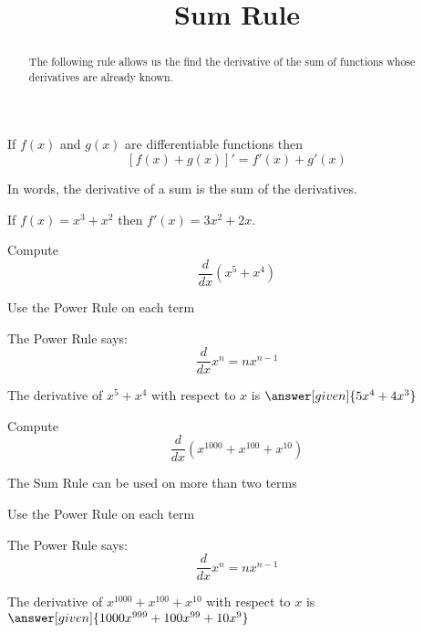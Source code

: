 \documentclass{ximera}
\title{Sum Rule}
\begin{document}
\begin{abstract}
The following rule allows us the find the derivative of the sum of functions 
whose derivatives are already known.
\end{abstract}

\maketitle

\begin{theorem} If $f(x)$ and $g(x)$ are differentiable functions then
\[[f(x) + g(x)]' =  f'(x) +  g'(x)\]
\end{theorem}

In words, the derivative of a sum is the sum of the derivatives.


\begin{example} %
If $f(x) = x^3 + x^2$ then $f'(x) = 3x^2 + 2x$.
\end{example}

\begin{problem} %
  Compute 
  \[
  \frac{d}{dx} (x^5 + x^4)
  \]
  
    \begin{hint}
      Use the Power Rule on each term
    \end{hint}
    \begin{hint}
      The Power Rule says:
      \[
      \frac{d}{dx} x^n = nx^{n-1}
      \]
    \end{hint}    
		The derivative of $x^5 + x^4$ with respect to $x$ is
		 $\answer[given]{5x^4 + 4x^3}$
	
\end{problem}

\begin{problem} %
  Compute 
  \[
  \frac{d}{dx} (x^{1000} + x^{100} + x^{10})
  \]
  
    \begin{hint}
		  The Sum Rule can be used on more than two terms
		\end{hint}
		\begin{hint}
      Use the Power Rule on each term
    \end{hint}
    \begin{hint}
      The Power Rule says:
      \[
      \frac{d}{dx} x^n = nx^{n-1}
      \]
    \end{hint}    
		The derivative of $x^{1000} + x^{100} + x^{10}$ with respect to $x$ is
		 $\answer[given]{1000x^{999} + 100x^{99} + 10x^9}$
	
\end{problem}
\end{document}
